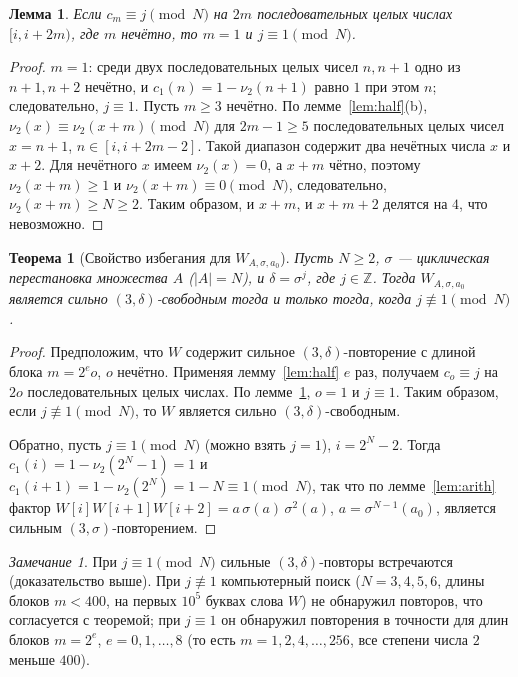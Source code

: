 \documentclass[a4paper,14pt]{extreport}
\theoremstyle{plain}
\newtheorem{theorem}{Теорема}[section]
\newtheorem{lemma}{Лемма}[section]
\theoremstyle{definition}
\theoremstyle{remark}
\newtheorem{remark}{Замечание}
\begin{document}
\begin{lemma}\label{lem:odd}
	Если $c_m\equiv j \pmod N$ на $2m$ последовательных целых числах $[i,i+2m)$, где $m$ нечётно, то $m=1$ и $j\equiv1\pmod N$.
\end{lemma}
\begin{proof}
	$m=1$: среди двух последовательных целых чисел $n,n+1$ одно из $n+1,n+2$ нечётно, и $c_1(n)=1-\nu_2(n+1)$ равно $1$ при этом $n$; следовательно, $j\equiv1$.
	Пусть $m\ge3$ нечётно. По лемме~\ref{lem:half}(b), $\nu_2(x)\equiv\nu_2(x+m)\pmod N$ для $2m-1\ge5$ последовательных целых чисел $x=n+1$, $n\in[i,i+2m-2]$.
	Такой диапазон содержит два нечётных числа $x$ и $x+2$. Для нечётного $x$ имеем $\nu_2(x)=0$, а $x+m$ чётно, поэтому $\nu_2(x+m)\ge1$ и $\nu_2(x+m)\equiv0\pmod N$, следовательно, $\nu_2(x+m)\ge N\ge2$.
	Таким образом, и $x+m$, и $x+m+2$ делятся на $4$, что невозможно.
\end{proof}

\begin{theorem}[Свойство избегания для $W_{A, \sigma, a_0}$]\label{avoidance}
	Пусть $N\ge2$, $\sigma$ --- циклическая перестановка множества $A$ ($|A|=N$), и $\delta=\sigma^j$, где $j\in\mathbb Z$.
	Тогда $W_{A,\sigma,a_0}$ является сильно $(3,\delta)$-свободным тогда и только тогда, когда $j\not\equiv1\pmod N$.
\end{theorem}

\begin{proof}
	Предположим, что $W$ содержит сильное $(3,\delta)$-повторение с длиной блока $m=2^e o$, $o$ нечётно. Применяя лемму~\ref{lem:half} $e$ раз, получаем $c_o\equiv j$ на $2o$ последовательных целых числах.
	По лемме~\ref{lem:odd}, $o=1$ и $j\equiv1$. Таким образом, если $j\not\equiv1\pmod N$, то $W$ является сильно $(3,\delta)$-свободным.
	
	Обратно, пусть $j\equiv1\pmod N$ (можно взять $j=1$), $i=2^N-2$. Тогда $c_1(i)=1-\nu_2(2^N-1)=1$ и $c_1(i+1)=1-\nu_2(2^N)=1-N\equiv1\pmod N$, так что по лемме~\ref{lem:arith}
	фактор $W[i]W[i+1]W[i+2]=a\,\sigma(a)\,\sigma^2(a)$, $a=\sigma^{N-1}(a_0)$, является сильным $(3,\sigma)$-повторением.
\end{proof}

\begin{remark}
	При $j\equiv1\pmod N$ сильные $(3,\delta)$-повторы встречаются (доказательство выше). При $j\not\equiv1$ компьютерный поиск ($N=3,4,5,6$, длины блоков $m<400$, на первых $10^5$ буквах слова $W$) не обнаружил повторов, что согласуется с теоремой; при $j\equiv1$ он обнаружил повторения в точности для длин блоков $m=2^e$, $e=0,1,\dots,8$ (то есть $m=1,2,4,\dots,256$, все степени числа $2$ меньше $400$).
\end{remark}
\end{document}
